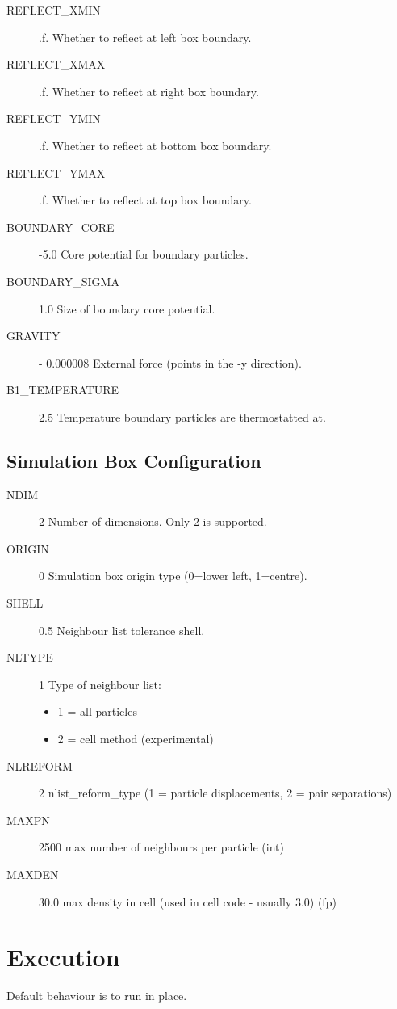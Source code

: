 \begin{description}
\item[REFLECT\_XMIN] .f.       Whether to reflect at left box boundary.
\item[REFLECT\_XMAX] .f.       Whether to reflect at right box boundary.
\item[REFLECT\_YMIN] .f.       Whether to reflect at bottom box boundary.
\item[REFLECT\_YMAX] .f.       Whether to reflect at top box boundary.
\item[BOUNDARY\_CORE]  -5.0 Core potential for boundary particles.
\item[BOUNDARY\_SIGMA] 1.0 Size of boundary core potential.
\item[GRAVITY] - 0.000008 External force (points in the -y direction).
\item[B1\_TEMPERATURE] 2.5 Temperature boundary particles are thermostatted at.
\end{description}

\subsection{Simulation Box Configuration}
\begin{description}
\item[NDIM] 2        Number of dimensions. Only 2 is supported.
\item[ORIGIN] 0      Simulation box origin type (0=lower left, 1=centre).
\item[SHELL] 0.5     Neighbour list tolerance shell.
\item[NLTYPE] 1      Type of neighbour list:
\begin{itemize}
\item  1 = all particles
\item  2 = cell method (experimental)
\end{itemize}
\item[NLREFORM] 2       nlist\_reform\_type (1 = particle displacements, 2 = pair separations) 
\item[MAXPN] 2500    max number of neighbours per particle (int)
\item[MAXDEN] 30.0   max density in cell (used in cell code - usually 3.0) (fp)
\end{description}

\section{Execution}
Default behaviour is to run in place.

